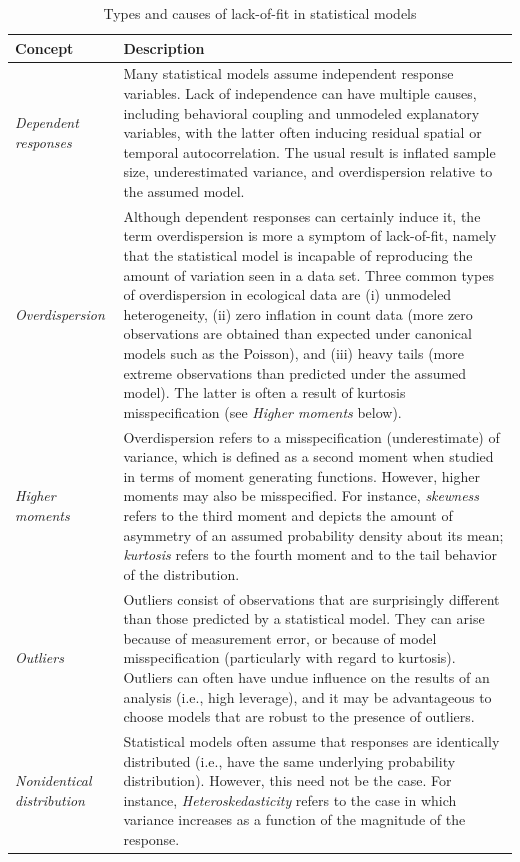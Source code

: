 \documentclass[12pt,english]{article}
\begin{document}
\begin{spacing}{1.9}
    \begin{table}[ht]
      \caption{Types and causes of lack-of-fit in statistical models}
      \label{tab:lof}
      \centering
      \begin{tabular}{p{3cm}p{13cm}}
        \hline
        Concept & Description \\
        \hline
        \textit{Dependent responses} & Many statistical models assume independent response variables.  Lack of independence can have multiple causes, including behavioral coupling and unmodeled explanatory variables, with the latter often inducing residual spatial or temporal autocorrelation.  The usual result is inflated sample size, underestimated variance, and overdispersion relative to the assumed model. \\
        \textit{Overdispersion} & Although dependent responses can certainly induce it, the term overdispersion is more a symptom of lack-of-fit, namely that the statistical model is incapable of reproducing the amount of variation seen in a data set.  Three common types of overdispersion in ecological data are (i) unmodeled heterogeneity, (ii) zero inflation in count data (more zero observations are obtained than expected under canonical models such as the Poisson), and (iii) heavy tails (more extreme observations than predicted under the assumed model). The latter is often a result of kurtosis misspecification (see \textit{Higher moments} below).\\
        \textit{Higher moments} & Overdispersion refers to a misspecification (underestimate) of variance, which is defined as a second moment when studied in terms of moment generating functions.  However, higher moments may also be misspecified. For instance, \textit{skewness} refers to the third moment and depicts the amount of asymmetry of an assumed probability density about its mean; \textit{kurtosis} refers to the fourth moment and to the tail behavior of the distribution.  \\
        \textit{Outliers} & Outliers consist of observations that are surprisingly different than those predicted by a statistical model.  They can arise because of measurement error, or because of model misspecification (particularly with regard to kurtosis).  Outliers can often have undue influence on the results of an analysis (i.e., high leverage), and it may be advantageous to choose models that are robust to the presence of outliers. \\
        \textit{Nonidentical distribution} & Statistical models often assume that responses are identically distributed (i.e., have the same underlying probability distribution). However, this need not be the case.  For instance, \textit{Heteroskedasticity} refers to the case in which variance increases as a function of the magnitude of the response.\\

\end{tabular}
\end{table}
\end{spacing}
\end{document}
